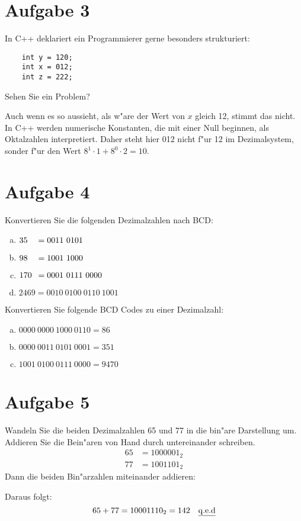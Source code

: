 \documentclass[10pt, oneside]{article}
\begin{document}
\section{Aufgabe 3}

In C++ deklariert ein Programmierer gerne besonders strukturiert:
\begin{verbatim}
    int y = 120;
    int x = 012;
    int z = 222;
\end{verbatim}
Sehen Sie ein Problem?

Auch wenn es so aussieht, als w"are der Wert von $x$ gleich 12, stimmt das
nicht. In C++ werden numerische Konstanten, die mit einer Null beginnen, als
Oktalzahlen interpretiert. Daher steht hier 012 nicht f"ur 12 im Dezimalsystem,
sonder f"ur den Wert $8^1 \cdot 1 + 8^0 \cdot 2 = 10$.

\section{Aufgabe 4}

Konvertieren Sie die folgenden Dezimalzahlen nach BCD:
\begin{enumerate}[(a)]
    \item $35\hphantom{0}\hphantom{0} = 0011\ 0101$
    \item $98\hphantom{0}\hphantom{0} = 1001\ 1000$
    \item $170\hphantom{0}            = 0001\ 0111\ 0000$
    \item $2469                       = 0010\ 0100\ 0110\ 1001$
\end{enumerate}
Konvertieren Sie folgende BCD Codes zu einer Dezimalzahl:
\begin{enumerate}[(a)]
    \item $0000\ 0000\ 1000\ 0110 = 86$
    \item $0000\ 0011\ 0101\ 0001 = 351$
    \item $1001\ 0100\ 0111\ 0000 = 9470$
\end{enumerate}

\section{Aufgabe 5}

Wandeln Sie die beiden Dezimalzahlen 65 und 77 in die bin"are Darstellung um.
Addieren Sie die Bein"aren von Hand durch untereinander schreiben.
\begin{align*}
    65 &= 1000001_2 \\[5pt]
    77 &= 1001101_2
\end{align*}
Dann die beiden Bin"arzahlen miteinander addieren:
\vspace{7.5pt}
\begin{center}
\end{center}
\vspace{7.5pt}
Daraus folgt:
\begin{equation*}
    65 + 77 = 10001110_2 = 142 \quad \text{\underline{q.e.d}}
\end{equation*}
\end{document}
